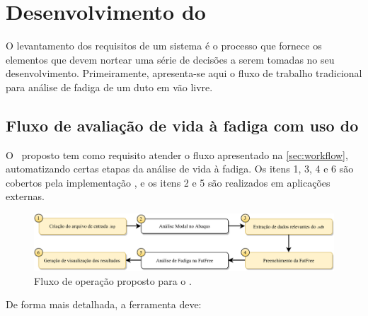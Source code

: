 \chapter{Desenvolvimento do \frame}\label{chap:software}

O levantamento dos requisitos de um sistema é o processo que fornece os elementos que devem nortear uma série de decisões a serem tomadas no seu desenvolvimento. Primeiramente, apresenta-se aqui o fluxo de trabalho tradicional para análise de fadiga de um duto em vão livre.




\section{Fluxo de avaliação de vida à fadiga com uso do \frame}


O \frame\ proposto tem como requisito atender o fluxo apresentado na \autoref{sec:workflow}, automatizando certas etapas da análise de vida à fadiga. Os itens 1, 3, 4 e 6 são cobertos pela implementação \frame, e os itens 2 e 5 são realizados em aplicações externas.


\begin{figure}[!ht]
    \centering
    \caption{Fluxo de operação proposto para o \frame.}\label{fig:workflow}
    \includegraphics[width=\textwidth]{imagens/fluxograma_automatizado}
\end{figure}

De forma mais detalhada, a ferramenta deve:

